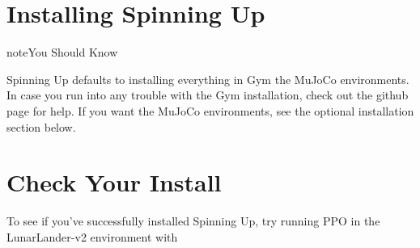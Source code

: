 \documentclass[letterpaper,10pt,english]{sphinxmanual}
\begin{document}
\begin{sphinxVerbatim}[commandchars=\\\{\}]
  
\end{sphinxVerbatim}


\section{Installing Spinning Up}
\label{\detokenize{user/installation:installing-spinning-up}}
\begin{sphinxVerbatim}[commandchars=\\\{\}]
  
 
   
\end{sphinxVerbatim}

\begin{sphinxadmonition}{note}{You Should Know}

Spinning Up defaults to installing everything in Gym  the MuJoCo environments. In case you run into any trouble with the Gym installation, check out the  github page for help. If you want the MuJoCo environments, see the optional installation section below.
\end{sphinxadmonition}


\section{Check Your Install}
\label{\detokenize{user/installation:check-your-install}}
To see if you’ve successfully installed Spinning Up, try running PPO in the LunarLander-v2 environment with

\begin{sphinxVerbatim}[commandchars=\\\{\}]
           
\end{sphinxVerbatim}
\end{document}
